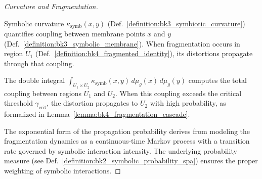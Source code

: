 \begin{proof}[Curvature and Fragmentation]
\label{proof:bk4_symbolic_curvature_fragmentation}
\leavevmode

Symbolic curvature $\kappa_{\text{symb}}(x,y)$
(Def.~\ref{definition:bk3_symbiotic_curvature}) quantifies coupling between
membrane points $x$ and $y$ (Def.~\ref{definition:bk3_symbolic_membrane}).
When fragmentation occurs in region $U_1$
(Def.~\ref{definition:bk4_fragmented_identity}), its distortions propagate
through that coupling.

The double integral $\int_{U_1 \times U_2} \kappa_{\text{symb}}(x,y) \, d\mu_g(x) \, d\mu_g(y)$ computes the total coupling between regions $U_1$ and $U_2$. When this coupling exceeds the critical threshold $\gamma_{\text{crit}}$, the distortion propagates to $U_2$ with high probability, as formalized in Lemma~\ref{lemma:bk4_fragmentation_cascade}.

The exponential form of the propagation probability derives from modeling the fragmentation dynamics as a continuous-time Markov process with a transition rate governed by symbolic interaction intensity. The underlying probability measure (see Def.~\ref{definition:bk2_symbolic_probability_spa}) ensures the proper weighting of symbolic interactions.
\end{proof}
